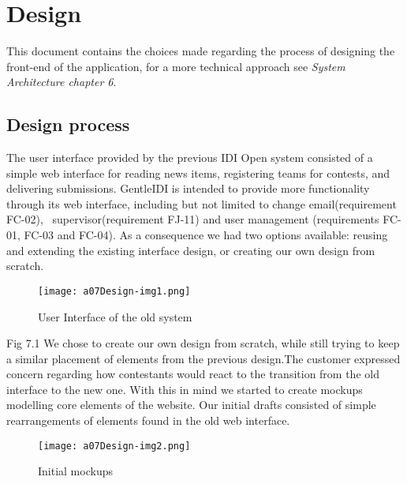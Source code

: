 \chapter{Design}
This document contains the choices made regarding the process of
designing the front-end of the application, for a more technical
approach see \textit{System Architecture chapter 6}.

\section{Design process}
\label{sec:designProcess}

The user interface provided by the previous IDI Open system consisted of
a simple web interface for reading news items, registering teams for
contests, and delivering submissions. GentleIDI is intended to provide
more functionality through its web interface, including but not limited
to change email(requirement FC-02), \ supervisor(requirement FJ-11) and
user management (requirements FC-01, FC-03 and FC-04). As a consequence
we had two options available: reusing and extending the existing
interface design, or creating our own design from scratch.

\begin{figure}[h!]
	\texttt{[image: a07Design-img1.png]} 
	\caption{User Interface of the old system}
	\label{fig:oldSystem}
\end{figure}
Fig 7.1
We chose to create our own design from scratch, while still trying to
keep a similar placement of elements from the previous design.The
customer expressed concern regarding how contestants would react to the
transition from the old interface to the new one. With this in mind we
started to create mockups modelling core elements of the website. Our
initial drafts consisted of simple rearrangements of elements found in
the old web interface.

\begin{figure}[h!]
	\texttt{[image: a07Design-img2.png]} 
	\caption{Initial mockups}
	\label{fig:mockup}
\end{figure}

